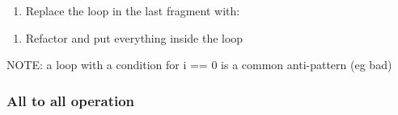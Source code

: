 \begin{enumerate}
\def\labelenumi{\arabic{enumi}.}
\itemsep1pt\parskip0pt
\item
  Replace the loop in the last fragment with:
\end{enumerate}

\begin{Shaded}
\begin{Highlighting}[]
\NormalTok{(} 
\end{Highlighting}
\end{Shaded}

\begin{enumerate}
\def\labelenumi{\arabic{enumi}.}
\setcounter{enumi}{1}
\itemsep1pt\parskip0pt
\item
  Refactor and put everything inside the loop
\end{enumerate}

\begin{Shaded}
\begin{Highlighting}[]
 \NormalTok{;}
\NormalTok{(} 
      \NormalTok{) \{ } \NormalTok{\}}
      \NormalTok{\}}
     \NormalTok{\}}
\NormalTok{\}}
\end{Highlighting}
\end{Shaded}

NOTE: a loop with a condition for i == 0 is a common anti-pattern (eg
bad)

\subsubsection{All to all operation}\label{all-to-all-operation}

\begin{Shaded}
\begin{Highlighting}[]
    
                  
\end{Highlighting}
\end{Shaded}

